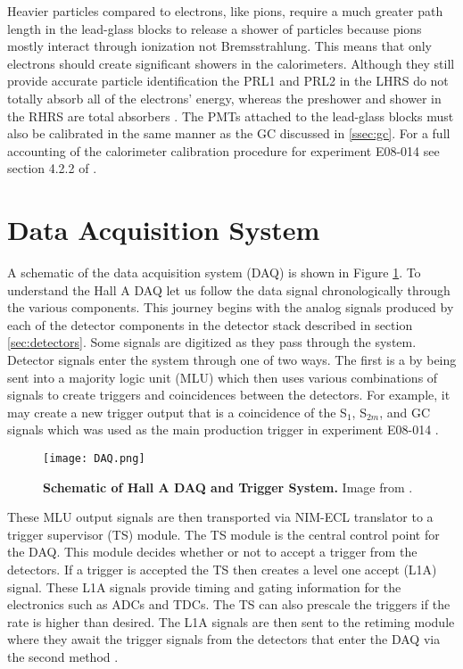 Heavier particles compared to electrons, like pions, require a much greater path length in the lead-glass blocks to release a shower of particles because pions mostly interact through ionization not Bremsstrahlung. This means that only electrons should create significant showers in the calorimeters. Although they still provide accurate particle identification the PRL1 and PRL2 in the LHRS do not totally absorb all of the electrons' energy, whereas the preshower and shower in the RHRS are total absorbers \cite{Thesis:Ye}. The PMTs attached to the lead-glass blocks must also be calibrated in the same manner as the GC discussed in \ref{ssec:gc}. For a full accounting of the calorimeter calibration procedure for experiment E08-014 see section 4.2.2 of \cite{Thesis:Ye}.

\section{Data Acquisition System}
\label{sec:daq}

A schematic of the data acquisition system (DAQ) is shown in Figure \ref{fig:daq}. To understand the Hall A DAQ let us follow the data signal chronologically through the various components. This journey begins with the analog signals produced by each of the detector components in the detector stack described in section \ref{sec:detectors}. Some signals are digitized as they pass through the system. Detector signals enter the system through one of two ways. The first is a by being sent into a majority logic unit (MLU) which then uses various combinations of signals to create triggers and coincidences between the detectors. For example, it may create a new trigger output that is a coincidence of the S$_1$, S$_{2m}$, and GC signals which was used as the main production trigger in experiment E08-014 \cite{DAQ}. 

\begin{figure}[!ht]
\begin{center}
\texttt{[image: DAQ.png]}
\end{center}
\caption[Schematic of Hall A DAQ and Trigger System]{
{\bf{Schematic of Hall A DAQ and Trigger System.}} Image from \cite{DAQ}.}
\label{fig:daq}
\end{figure}

These MLU output signals are then transported via NIM-ECL translator to a trigger supervisor (TS) module. The TS module is the central control point for the DAQ. This module decides whether or not to accept a trigger from the detectors. If a trigger is accepted the TS then creates a level one accept (L1A) signal. These L1A signals provide timing and gating information for the electronics such as ADCs and TDCs. The TS can also prescale the triggers if the rate is higher than desired. The L1A signals are then sent to the retiming module where they await the trigger signals from the detectors that enter the DAQ via the second method \cite{DAQ}.

